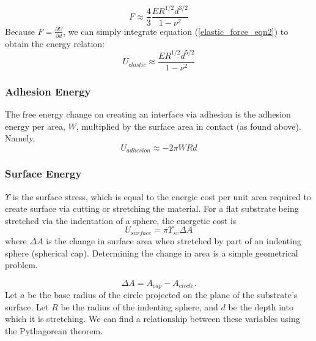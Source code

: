 \begin{equation}
F \approx \frac{4}{3}\frac{ER^{1/2}d^{3/2}}{1-\nu^2}
\label{elastic_force_eqn2}
\end{equation}
Because $F = \frac{\partial U}{\partial d}$, we can simply integrate equation (\ref{elastic_force_eqn2}) to obtain the energy relation:
\begin{equation}
\label{elastic_energy}
U_{elastic} \approx  \frac{ER^{1/2}d^{5/2}}{1-\nu^2}
\end{equation}


\subsubsection{Adhesion Energy}
The free energy change on creating an interface via adhesion is the adhesion energy per area, $ W $, multiplied by the surface area in contact (as found above). Namely,
\begin{equation}
\label{W_energy}
U_{adhesion} \approx -2\pi W R d 
\end{equation}


\subsubsection{Surface Energy}
$\Upsilon$ is the surface stress, which is equal to the energic cost per unit area required to create surface via cutting or stretching the material. For a flat substrate being stretched via the indentation of a sphere, the energetic cost is
\begin{equation}
\label{generic_surface_energy}
U_{surface} = \pi \Upsilon_{sv}\Delta A
\end{equation}
where $\Delta A$ is the change in surface area when stretched by part of an indenting sphere (spherical cap). Determining the change in area is a simple geometrical problem.

\begin{equation}
\Delta A = A_{cap} - A_{circle}. 
\end{equation}
Let $ a $ be the base radius of the circle projected on the plane of the substrate's surface. Let $ R $ be the radius of the indenting sphere, and $ d $ be the depth into which it is stretching. We can find a relationship between these variables using the Pythagorean theorem.

